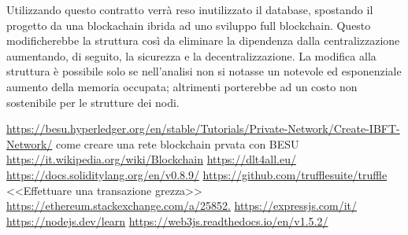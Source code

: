 \documentclass[11pt,a4paper,titlepage]{report}
\begin{document}
Utilizzando questo contratto verrà reso inutilizzato il database, spostando il progetto da una blockachain ibrida ad uno sviluppo full blockchain. Questo modificherebbe la struttura così da eliminare la dipendenza dalla centralizzazione aumentando, di seguito, la sicurezza e la decentralizzazione. La modifica alla struttura è possibile solo se nell'analisi non si notasse un notevole ed esponenziale aumento della memoria occupata; altrimenti porterebbe ad un costo non sostenibile per le strutture dei nodi.

\begin{thebibliography}{1}
\bibitem{} \url{https://besu.hyperledger.org/en/stable/Tutorials/Private-Network/Create-IBFT-Network/} come creare una rete blockchain prvata con BESU
\bibitem{} \url{https://it.wikipedia.org/wiki/Blockchain}
\bibitem{} \url{https://dlt4all.eu/}
\bibitem{} \url{https://docs.soliditylang.org/en/v0.8.9/}
\bibitem{} \url{https://github.com/trufflesuite/truffle}
\bibitem{}<<Effettuare una transazione grezza>> \url{https://ethereum.stackexchange.com/a/25852.}
\bibitem{} \url{https://expressjs.com/it/}
\bibitem{} \url{https://nodejs.dev/learn}
\bibitem{} \url{https://web3js.readthedocs.io/en/v1.5.2/}
\end{thebibliography}

\listoffigures
\end{document}
